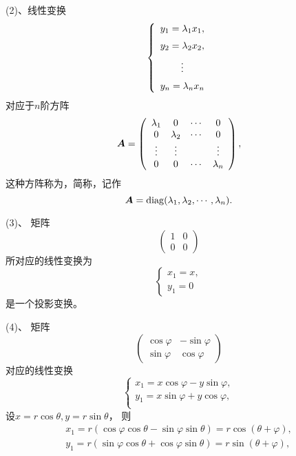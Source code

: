 (2)、线性变换
$$
\left\{
  \begin{array}{c}
    y_1 = \lambda_1 x_1, \\[0.2cm]
    y_2 = \lambda_2 x_2, \\[0.2cm]
    \vdots \\[0.2cm]
    y_n = \lambda_n x_n
  \end{array}
\right.
$$  
对应于$n$阶方阵
$$
\boldsymbol{A} = \left(
  \begin{array}{cccc}
    \lambda_1& 0    & \cdots  & 0 \\
    0    & \lambda_2    & \cdots  & 0 \\
    \vdots  & \vdots  &      & \vdots \\
    0    & 0    & \cdots  & \lambda_n
  \end{array}
\right),
$$
这种方阵称为，简称，记作
$$
\boldsymbol{A} = \mathrm{diag}(\lambda_1,\lambda_2,\cdots,\lambda_n).
$$

(3)、  矩阵
$$
\left(
  \begin{array}{cc}
    1 & 0 \\
    0 & 0 
  \end{array}
\right)
$$ 
所对应的线性变换为
$$
\left\{
  \begin{array}{l}
    x_1 = x, \\[0.2cm]
    y_1 = 0
  \end{array}
\right.
$$
是一个投影变换。 
\begin{figure}[htbp]
  \centering
\end{figure}

(4)、    矩阵
$$
\left(
  \begin{array}{rr}
    \cos \varphi & -\sin \varphi \\
    \sin \varphi &  \cos \varphi 
  \end{array}
\right)
$$  
对应的线性变换
$$
\left \{
  \begin{array}{l}
    x_1 = x \cos \varphi - y \sin \varphi, \\[0.2cm]
    y_1 = x \sin \varphi + y \cos \varphi, \\[0.2cm]
  \end{array}
\right.
$$
设$x=r\cos \theta, y = r\sin \theta$，
则
$$
\begin{array}{l}
  x_1 = r(\cos\varphi \cos\theta - \sin\varphi \sin\theta) = r\cos(\theta+\varphi), \\[0.2cm]
  y_1 = r(\sin\varphi \cos\theta + \cos\varphi \sin\theta) = r\sin(\theta+\varphi), 
\end{array}
$$

